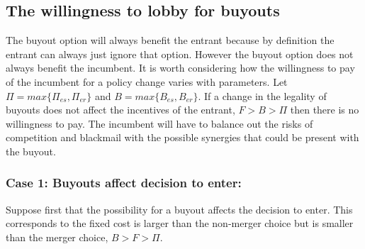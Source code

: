 \documentclass[12pt]{report}
\numberwithin{equation}{section}
\begin{document}
\subsection{The willingness to lobby for buyouts}

The buyout option will always benefit the entrant because by definition the entrant can always just ignore that option. However the buyout option does not always benefit the incumbent. It is worth considering how the willingness to pay of the incumbent for a policy change varies with parameters.
Let $\Pi = max\{ \Pi_{es},\Pi_{er} \}$ and $B = max\{ B_{es},B_{er} \}$. If a change in the legality of buyouts does not affect the incentives of the entrant, $F>B>\Pi$ then there is no willingness to pay. The incumbent will have to balance out the risks of competition and blackmail with the possible synergies that could be present with the buyout.

\subsubsection{Case 1: Buyouts affect decision to enter: } \label{case:decision}

Suppose first that the possibility for a buyout affects the decision to enter. This corresponds to the fixed cost is larger than the non-merger choice but is smaller than the merger choice, $B>F> \Pi$.
\end{document}
